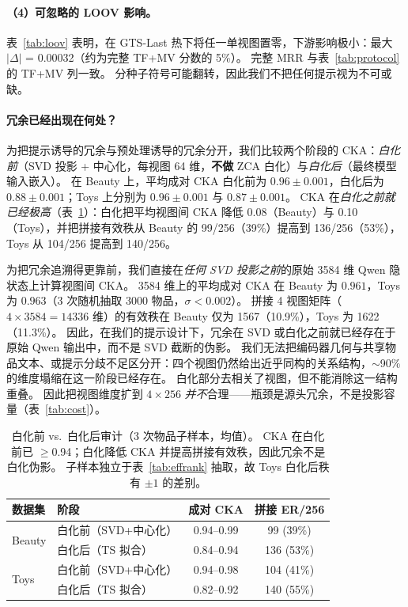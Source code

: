 \documentclass[sigconf,natbib=true,anonymous]{acmart}
\newcommand{\tfmv}{\textsc{TF+MV}\xspace}
\begin{document}
\paragraph{（4）可忽略的 LOOV 影响。}
表~\ref{tab:loov} 表明，在 GTS-Last 热下将任一单视图置零，下游影响极小：最大 $|\Delta|$ = 0.00032（约为完整 \tfmv 分数的 5\%）。
完整 MRR 与表~\ref{tab:protocol} 的 \tfmv 列一致。
分种子符号可能翻转，因此我们不把任何提示视为不可或缺。

\paragraph{冗余已经出现在何处？}
为把提示诱导的冗余与预处理诱导的冗余分开，我们比较两个阶段的 CKA：\emph{白化前}（SVD 投影 + 中心化，每视图 64 维，\textbf{不做} ZCA 白化）与\emph{白化后}（最终模型输入嵌入）。
在 Beauty 上，平均成对 CKA 白化前为 $0.96\pm0.001$，白化后为 $0.88\pm0.001$；Toys 上分别为 $0.96\pm0.001$ 与 $0.87\pm0.001$。
CKA 在\emph{白化之前就已经极高}（表~\ref{tab:cka-prepost}）：白化把平均视图间 CKA 降低 0.08（Beauty）与 0.10（Toys），并把拼接有效秩从 Beauty 的 99/256（39\%）提高到 136/256（53\%），Toys 从 104/256 提高到 140/256。

为把冗余追溯得更靠前，我们直接在\emph{任何 SVD 投影之前}的原始 3584 维 Qwen 隐状态上计算视图间 CKA。
3584 维上的平均成对 CKA 在 Beauty 为 $0.961$，Toys 为 $0.963$（3 次随机抽取 3000 物品，$\sigma < 0.002$）。
拼接 4 视图矩阵（$4\times 3584 = 14336$ 维）的有效秩在 Beauty 仅为 1567（10.9\%），Toys 为 1622（11.3\%）。
因此，在我们的提示设计下，冗余在 SVD 或白化之前就已经存在于原始 Qwen 输出中，而不是 SVD 截断的伪影。
我们无法把编码器几何与共享物品文本、或提示分歧不足区分开：四个视图仍然给出近乎同构的关系结构，$\sim$90\% 的维度塌缩在这一阶段已经存在。
白化部分去相关了视图，但不能消除这一结构重叠。
因此把视图维度扩到 $4\times256$ \emph{并不}合理——瓶颈是源头冗余，不是投影容量（表~\ref{tab:cost}）。

\begin{table}[t]
\centering
\caption{%
白化前 vs.\ 白化后审计（3 次物品子样本，均值）。
CKA 在白化前已 $\ge$0.94；白化降低 CKA 并提高拼接有效秩，因此冗余不是白化伪影。
子样本独立于表~\ref{tab:effrank} 抽取，故 Toys 白化后秩有 $\pm 1$ 的差别。%
}
\label{tab:cka-prepost}
\small
\begin{tabular}{@{}llcc@{}}
\toprule
数据集 & 阶段 & 成对 CKA & 拼接 ER/256 \\
\midrule
\multirow{2}{*}{Beauty}
 & 白化前（SVD+中心化）  & 0.94--0.99 & 99 (39\%) \\
 & 白化后（TS 拟合）     & 0.84--0.94 & 136 (53\%) \\
\midrule
\multirow{2}{*}{Toys}
 & 白化前（SVD+中心化）  & 0.94--0.98 & 104 (41\%) \\
 & 白化后（TS 拟合）     & 0.82--0.92 & 140 (55\%) \\
\bottomrule
\end{tabular}
\end{table}
\end{document}
